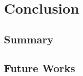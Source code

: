 \chapter{Conclusion}
\label{chapter:conclusion}

\section{Summary}
\label{sec:summary}

\section{Future Works}
\label{sec:future_works}
